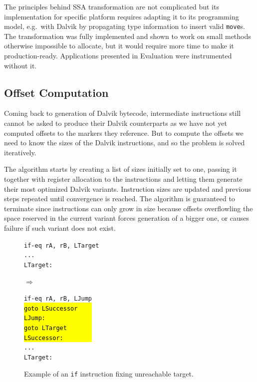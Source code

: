 \documentclass[12pt,twoside,notitlepage]{report}
\newcommand{\asm}[1] {\texttt{#1}}
\newcommand{\asmExtra}[1] {\texttt{\hl{#1}}}
\begin{document}
The principles behind SSA transformation are not complicated but its implementation for specific platform requires adapting it to its programming model, e.g.\ with Dalvik by propagating type information to insert valid \texttt{move}s. The transformation was fully implemented and shown to work on small methods otherwise impossible to allocate, but it would require more time to make it production-ready. Applications presented in Evaluation were instrumented without it.

\subsection{Offset Computation}

Coming back to generation of Dalvik bytecode, intermediate instructions still cannot be asked to produce their Dalvik counterparts as we have not yet computed offsets to the markers they reference. But to compute the offsets we need to know the sizes of the Dalvik instructions, and so the problem is solved iteratively.

The algorithm starts by creating a list of sizes initially set to one, passing it together with register allocation to the instructions and letting them generate their most optimized Dalvik variants. Instruction sizes are updated and previous steps repeated until convergence is reached. The algorithm is guaranteed to terminate since instructions can only grow in size because offsets overflowling the space reserved in the current variant forces generation of a bigger one, or causes failure if such variant does not exist.

\begin{figure}[t]
	\centering
	\begin{minipage}{0.28\textwidth}
	\begin{footnotesize}
		\asm{if-eq rA, rB, LTarget} \\
		\asm{...} \\
		\asm{LTarget:}
	\end{footnotesize}
	\end{minipage}
	\begin{minipage}{0.09\textwidth}
	\centering
	$\Rightarrow$
	\end{minipage}
	\begin{minipage}{0.25\textwidth}
	\begin{footnotesize}
		\asm{if-eq rA, rB, LJump} \\
		\asmExtra{goto LSuccessor~~~~} \\
		\asmExtra{LJump:~~~~~~~~~~~~~} \\
		\asmExtra{goto LTarget~~~~~~~} \\
		\asmExtra{LSuccessor:~~~~~~~~} \\
		\asm{...} \\
		\asm{LTarget:}
	\end{footnotesize}
	\end{minipage}
	\caption{Example of an \texttt{if} instruction fixing unreachable target.}
	\label{figure:Reassembling_FixLongJump}
\end{figure}
\end{document}
